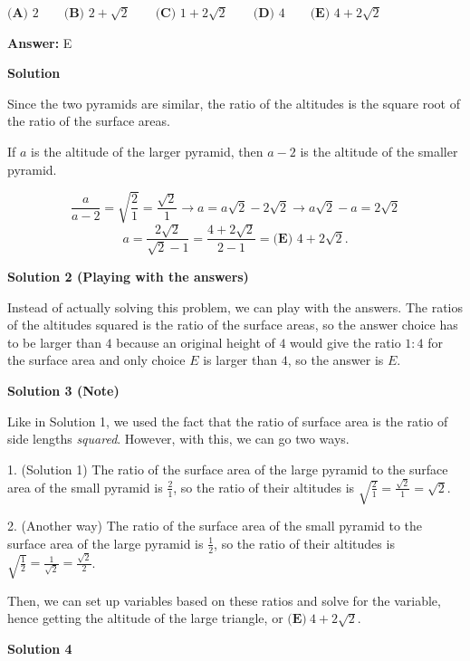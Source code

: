 \begin{enumerate}
 $\textbf{(A) } 2 \qquad\textbf{(B) } 2+\sqrt{2} \qquad\textbf{(C) } 1+2\sqrt{2} \qquad\textbf{(D) } 4 \qquad\textbf{(E) } 4+2\sqrt{2}$

 \textbf{Answer: }E



\textbf{Solution}

Since the two pyramids are similar, the ratio of the altitudes is the square root of the ratio of the surface areas.

 If $a$ is the altitude of the larger pyramid, then $a-2$ is the altitude of the smaller pyramid.

 
 \[\frac{a}{a-2}=\sqrt{\frac21}=\frac{\sqrt{2}}{1} \longrightarrow a= a\sqrt{2} - 2\sqrt{2} \longrightarrow a\sqrt{2}-a=2\sqrt{2}\]
 \[a=\frac{2\sqrt{2}}{\sqrt{2}-1} = \frac{4+2\sqrt{2}}{2-1} = \boxed{\textbf{(E) \ } 4+2\sqrt{2}}.\]




\textbf{Solution 2 (Playing with the answers)}

Instead of actually solving this problem, we can play with the answers. The ratios of the altitudes squared is the ratio of the surface areas, so the answer choice has to be larger than $4$ because an original height of $4$ would give the ratio $1:4$ for the surface area and only choice $E$ is larger than $4$, so the answer is $E$.

 



\textbf{Solution 3 (Note)}

Like in Solution 1, we used the fact that the ratio of surface area is the ratio of side lengths \textit{squared}. However, with this, we can go two ways. 

 1. (Solution 1) The ratio of the surface area of the large pyramid to the surface area of the small pyramid is $\frac 21$, so the ratio of their altitudes is $\sqrt{\frac21}=\frac{\sqrt{2}}{1}=\sqrt2$. 

 2. (Another way) The ratio of the surface area of the small pyramid to the surface area of the large pyramid is $\frac 12$, so the ratio of their altitudes is $\sqrt{\frac12}=\frac{1}{\sqrt2}=\frac{\sqrt2}{2}$.  

 
Then, we can set up variables based on these ratios and solve for the variable, hence getting the altitude of the large triangle, or $\boxed{\textbf{(E)}~4+2\sqrt 2}.$




\textbf{Solution 4}


\end{enumerate}
